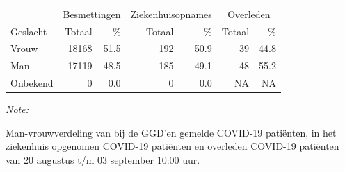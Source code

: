 \documentclass[
  english,
  man,floatsintext]{apa6}
\begin{document}
\begin{table}
\centering\begingroup\fontsize{11}{13}\selectfont

\begin{threeparttable}
\begin{tabular}{lrrrrrr}
\toprule
\multicolumn{1}{c}{ } & \multicolumn{2}{c}{Besmettingen} & \multicolumn{2}{c}{Ziekenhuisopnames} & \multicolumn{2}{c}{Overleden} \\
\cmidrule(l{3pt}r{3pt}){2-3} \cmidrule(l{3pt}r{3pt}){4-5} \cmidrule(l{3pt}r{3pt}){6-7}
Geslacht & Totaal & \% & Totaal & \% & Totaal & \%\\
\midrule
Vrouw & 18168 & 51.5 & 192 & 50.9 & 39 & 44.8\\
Man & 17119 & 48.5 & 185 & 49.1 & 48 & 55.2\\
Onbekend & 0 & 0.0 & 0 & 0.0 & NA & NA\\
\bottomrule
\end{tabular}
\begin{tablenotes}
\item \textit{Note: } 
\item Man-vrouwverdeling van bij de GGD’en gemelde COVID-19 patiënten, in het ziekenhuis opgenomen COVID-19 patiënten en overleden COVID-19 patiënten van 20 augustus t/m 03 september 10:00 uur.
\end{tablenotes}
\end{threeparttable}
\endgroup{}
\end{table}
\newpage
\end{document}
